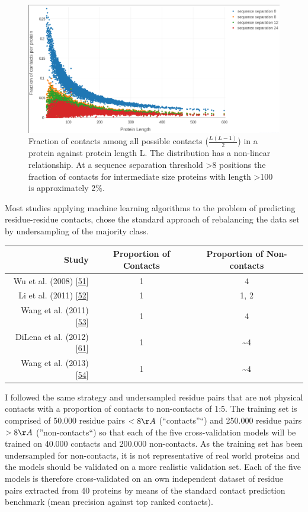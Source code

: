 \documentclass[12pt,a4paper,twoside]{book}
\theoremstyle{definition}
\theoremstyle{definition}
\theoremstyle{remark}
\begin{document}
\begin{figure}

{\centering \includegraphics[width=0.8\linewidth]{img/random_forest_contact_prior/fraction_contacts_vs_protein_length_thr8} 

}

\caption{Fraction of contacts
among all possible contacts (\(\frac{L(L-1)}{2}\)) in a protein against
protein length L. The distribution has a non-linear relationship. At a
sequence separation threshold \textgreater{}8 positions the fraction of
contacts for intermediate size proteins with length \textgreater{}100 is
approximately 2\%.}\label{fig:fraction-contacts-vs-protein-length}
\end{figure}

Most studies applying machine learning algorithms to the problem of
predicting residue-residue contacts, chose the standard approach of
rebalancing the data set by undersampling of the majority class.

\begin{longtable}[]{@{}rcc@{}}
\toprule
Study & Proportion of Contacts & Proportion of
Non-contacts\tabularnewline
\midrule
\endhead
Wu et al. (2008) {[}\protect\hyperlink{ref-Wu2008}{51}{]} & 1 &
4\tabularnewline
Li et al. (2011) {[}\protect\hyperlink{ref-Li2011}{52}{]} & 1 & 1,
2\tabularnewline
Wang et al. (2011) {[}\protect\hyperlink{ref-Wang2011}{53}{]} & 1 &
4\tabularnewline
DiLena et al. (2012) {[}\protect\hyperlink{ref-DiLena2012a}{61}{]} & 1 &
\textasciitilde{}4\tabularnewline
Wang et al. (2013) {[}\protect\hyperlink{ref-Wang2013}{54}{]} & 1 &
\textasciitilde{}4\tabularnewline
\bottomrule
\end{longtable}

I followed the same strategy and undersampled residue pairs that are not
physical contacts with a proportion of contacts to non-contacts of 1:5.
The training set is comprised of 50.000 residue pairs \(< 8 \AA\)
(``contacts''``) and 250.000 residue pairs \(> 8 \AA\)
(''non-contacts``) so that each of the five cross-validation models will
be trained on 40.000 contacts and 200.000 non-contacts. As the training
set has been undersampled for non-contacts, it is not representative of
real world proteins and the models should be validated on a more
realistic validation set. Each of the five models is therefore
cross-validated on an own independent dataset of residue pairs extracted
from 40 proteins by means of the standard contact prediction benchmark
(mean precision against top ranked contacts).
\end{document}
